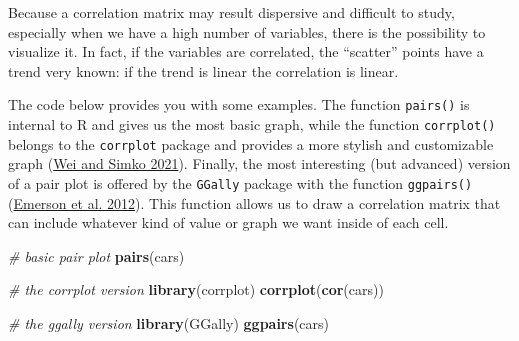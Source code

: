 \documentclass[
]{article}
\newenvironment{Shaded}{\begin{snugshade}}{\end{snugshade}}
\newcommand{\AttributeTok}[1]{\textcolor[rgb]{0.13,0.29,0.53}{#1}}
\newcommand{\CommentTok}[1]{\textcolor[rgb]{0.56,0.35,0.01}{\textit{#1}}}
\newcommand{\DecValTok}[1]{\textcolor[rgb]{0.00,0.00,0.81}{#1}}
\newcommand{\FunctionTok}[1]{\textcolor[rgb]{0.13,0.29,0.53}{\textbf{#1}}}
\newcommand{\NormalTok}[1]{#1}
\newcommand{\SpecialCharTok}[1]{\textcolor[rgb]{0.81,0.36,0.00}{\textbf{#1}}}
\newcommand{\StringTok}[1]{\textcolor[rgb]{0.31,0.60,0.02}{#1}}
\begin{document}
\begin{Shaded}
\end{Shaded}

Because a correlation matrix may result dispersive and difficult to
study, especially when we have a high number of variables, there is the
possibility to visualize it. In fact, if the variables are correlated,
the ``scatter'' points have a trend very known: if the trend is linear the
correlation is linear.

The code below provides you with some examples. The function \texttt{pairs()}
is internal to R and gives us the most basic graph, while the function
\texttt{corrplot()} belongs to the \texttt{corrplot} package and provides a more
stylish and customizable graph (\protect\hyperlink{ref-wei2021}{Wei and Simko 2021}). Finally, the most interesting
(but advanced) version of a pair plot is offered by the \texttt{GGally} package
with the function \texttt{ggpairs()}(\protect\hyperlink{ref-emerson2012}{Emerson et al. 2012}). This function allows us to
draw a correlation matrix that can include whatever kind of value or
graph we want inside of each cell.

\begin{Shaded}
\begin{Highlighting}[]
\CommentTok{\# basic pair plot}
\FunctionTok{pairs}\NormalTok{(cars)}

\CommentTok{\# the corrplot version}
\FunctionTok{library}\NormalTok{(corrplot)}
\FunctionTok{corrplot}\NormalTok{(}\FunctionTok{cor}\NormalTok{(cars))}

\CommentTok{\# the ggally version}
\FunctionTok{library}\NormalTok{(GGally)}
\FunctionTok{ggpairs}\NormalTok{(cars)}
\end{Highlighting}
\end{Shaded}
\end{document}
